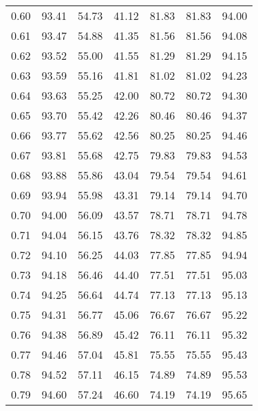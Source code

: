 \begin{tabular}{|c|c|c|c|c|c|c|}
      0.60 &     93.41 &     54.73 &      41.12 &   81.83 &      81.83 &         94.00 \\
      0.61 &     93.47 &     54.88 &      41.35 &   81.56 &      81.56 &         94.08 \\
      0.62 &     93.52 &     55.00 &      41.55 &   81.29 &      81.29 &         94.15 \\
      0.63 &     93.59 &     55.16 &      41.81 &   81.02 &      81.02 &         94.23 \\
      0.64 &     93.63 &     55.25 &      42.00 &   80.72 &      80.72 &         94.30 \\
      0.65 &     93.70 &     55.42 &      42.26 &   80.46 &      80.46 &         94.37 \\
      0.66 &     93.77 &     55.62 &      42.56 &   80.25 &      80.25 &         94.46 \\
      0.67 &     93.81 &     55.68 &      42.75 &   79.83 &      79.83 &         94.53 \\
      0.68 &     93.88 &     55.86 &      43.04 &   79.54 &      79.54 &         94.61 \\
      0.69 &     93.94 &     55.98 &      43.31 &   79.14 &      79.14 &         94.70 \\
      0.70 &     94.00 &     56.09 &      43.57 &   78.71 &      78.71 &         94.78 \\
      0.71 &     94.04 &     56.15 &      43.76 &   78.32 &      78.32 &         94.85 \\
      0.72 &     94.10 &     56.25 &      44.03 &   77.85 &      77.85 &         94.94 \\
      0.73 &     94.18 &     56.46 &      44.40 &   77.51 &      77.51 &         95.03 \\
      0.74 &     94.25 &     56.64 &      44.74 &   77.13 &      77.13 &         95.13 \\
      0.75 &     94.31 &     56.77 &      45.06 &   76.67 &      76.67 &         95.22 \\
      0.76 &     94.38 &     56.89 &      45.42 &   76.11 &      76.11 &         95.32 \\
      0.77 &     94.46 &     57.04 &      45.81 &   75.55 &      75.55 &         95.43 \\
      0.78 &     94.52 &     57.11 &      46.15 &   74.89 &      74.89 &         95.53 \\
      0.79 &     94.60 &     57.24 &      46.60 &   74.19 &      74.19 &         95.65 \\

\end{tabular}
